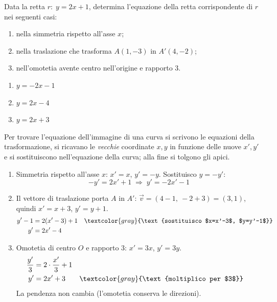 \begin{question}[ID=4.1, subtitle={Trasformazioni della retta $y=2x+1$}, tags={trasformazioni geometriche, retta}, difficulty=media]
Data la retta $r:\; y = 2x + 1$, determina l'equazione della retta corrispondente di $r$ nei seguenti casi:
\begin{enumerate}
\item nella simmetria rispetto all'asse $x$;
\item nella traslazione che trasforma $A(1,-3)$ in $A'(4,-2)$;
\item nell'omotetia avente centro nell'origine e rapporto 3.
\end{enumerate}
\begin{solution}
\begin{enumerate}
    \item $y=-2x-1$
    \item $y=2x-4$
    \item $y=2x+3$
\end{enumerate}
\end{solution}
\begin{explanation}
Per trovare l'equazione dell'immagine di una curva si scrivono le equazioni della trasformazione, si ricavano le \emph{vecchie} coordinate $x,y$ in funzione delle nuove $x',y'$ e si sostituiscono nell'equazione della curva; alla fine si tolgono gli apici.
\begin{enumerate}
    \item Simmetria rispetto all'asse $x$: $x'=x$, $y'=-y$. Sostituisco $y=-y'$:
    \[ -y'=2x'+1 \;\Rightarrow\; y'=-2x'-1 \]
    \item Il vettore di traslazione porta $A$ in $A'$: $\vec v=(4-1,\ -2+3)=(3,1)$, quindi $x'=x+3$, $y'=y+1$.
    \[\begin{aligned}
    y'-1 &= 2(x'-3)+1 && \textcolor{gray}{\text{sostituisco $x=x'-3$, $y=y'-1$}}\\
    y' &= 2x'-4
    \end{aligned}\]
    \item Omotetia di centro $O$ e rapporto $3$: $x'=3x$, $y'=3y$.
    \[\begin{aligned}
    \dfrac{y'}{3} &= 2\cdot\dfrac{x'}{3}+1\\
    y' &= 2x'+3 && \textcolor{gray}{\text{moltiplico per $3$}}
    \end{aligned}\]
    La pendenza non cambia (l'omotetia conserva le direzioni).
\end{enumerate}
\end{explanation}
\end{question}

